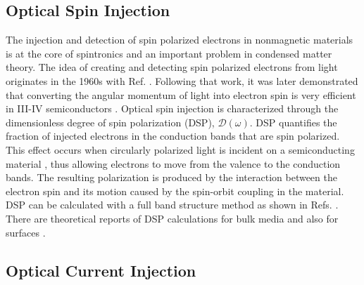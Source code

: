 
\subsection{Optical Spin Injection}

The injection and detection of spin polarized electrons in nonmagnetic materials
is at the core of spintronics \cite{vzuticRMP04, fertRMP08} and an important
problem in condensed matter theory. The idea of creating and detecting spin
polarized electrons from light originates in the 1960s with Ref.
\cite{lampelPRL68}. Following that work, it was later demonstrated that
converting the angular momentum of light into electron spin is very efficient in
III-IV semiconductors \cite{dyakonovOO84}. Optical spin injection is
characterized through the dimensionless degree of spin polarization (DSP),
$\boldsymbol{\mathcal{D}}(\omega)$. DSP quantifies the fraction of injected
electrons in the conduction bands that are spin polarized. This effect occurs
when circularly polarized light is incident on a semiconducting material
\cite{dyakonovOO84}, thus allowing electrons to move from the valence to the
conduction bands. The resulting polarization is produced by the interaction
between the electron spin and its motion caused by the spin-orbit coupling in
the material. DSP can be calculated with a full band structure method as shown
in Refs. \cite{nastosPRB07,cabellosPRB09}. There are theoretical reports of DSP
calculations for bulk media \cite{nastosPRB07, cabellosPRB09} and also for
surfaces \cite{mendozaPRB12, arzatePRB14}.



\subsection{Optical Current Injection}

